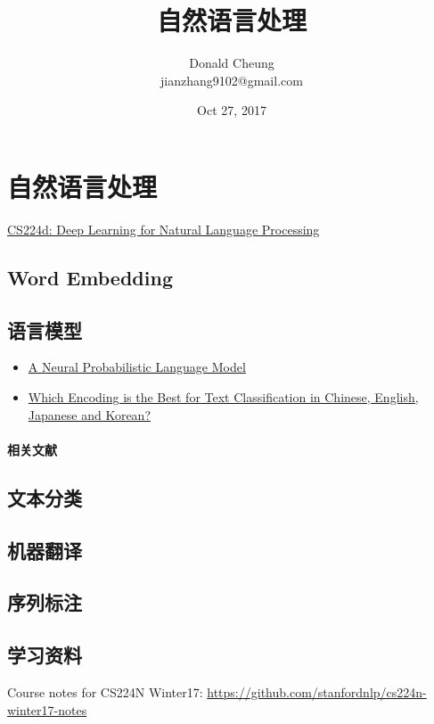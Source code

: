 \documentclass[10pt,a4paper]{ctexbook}
\begin{document}
    \setlength{\baselineskip}{20pt}
    \title{自然语言处理}
    \author{Donald Cheung\\jianzhang9102@gmail.com}
    \date{Oct 27, 2017}
    \maketitle
    \tableofcontents
\fi

\chapter{自然语言处理}

\href{https://cs224d.stanford.edu}{CS224d: Deep Learning for Natural Language Processing}


\section{Word Embedding}

\section{语言模型}
\begin{itemize}
\item \href{http://www.jmlr.org/papers/volume3/bengio03a/bengio03a.pdf}{A Neural Probabilistic Language Model}
\item \href{https://arxiv.org/pdf/1708.02657.pdf}{Which Encoding is the Best for Text Classification in Chinese, English, Japanese and Korean?}
\end{itemize}

\subsubsection{相关文献}
\section{文本分类}
\section{机器翻译}
\section{序列标注}

\section{学习资料}
Course notes for CS224N Winter17: \url{https://github.com/stanfordnlp/cs224n-winter17-notes}



\ifx\mlbook\undefined
    
\end{document}
